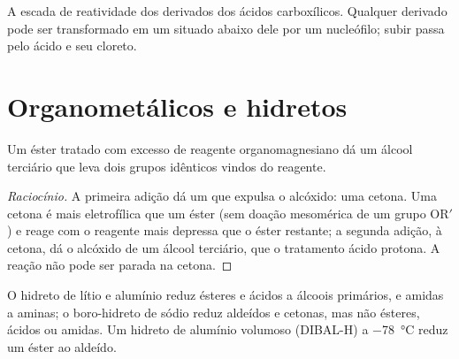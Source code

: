\begin{omfigure}

{\small A escada de reatividade dos derivados dos ácidos carboxílicos. Qualquer derivado pode ser
transformado em um situado abaixo dele por um nucleófilo; subir passa pelo ácido e seu cloreto.}
\end{omfigure}

\section{Organometálicos e hidretos}

\begin{proposition}\label{prop:b2:acyl-substitution:grignard-ester}
Um éster tratado com excesso de reagente organomagnesiano dá um álcool terciário que leva dois
grupos idênticos vindos do reagente.
\end{proposition}

\begin{proof}[Raciocínio]
A primeira adição dá um  que expulsa o alcóxido: uma cetona. Uma cetona
é mais eletrofílica que um éster (sem doação mesomérica de um grupo $\mathrm{OR'}$) e reage com
o reagente mais depressa que o éster restante; a segunda adição, à cetona, dá o alcóxido
de um álcool terciário, que o tratamento ácido protona. A reação não pode ser parada na cetona.
\end{proof}

\begin{proposition}\label{prop:b2:acyl-substitution:hydrides}
O hidreto de lítio e alumínio reduz ésteres e ácidos a álcoois primários, e amidas a aminas; o
boro-hidreto de sódio reduz aldeídos e cetonas, mas não ésteres, ácidos ou amidas. Um hidreto de
alumínio volumoso (DIBAL-H) a \qty{-78}{\degreeCelsius} reduz um éster ao aldeído.
\end{proposition}

